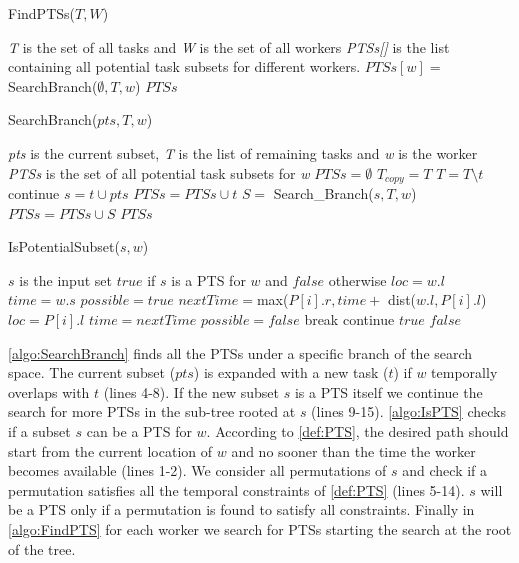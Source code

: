 \begin{algorithm}[h]
\caption{FindPTSs($T, W$)}
\label{algo:FindPTS}
\begin{algorithmic}[1]
\REQUIRE \emph{T} is the set of all tasks and \emph{W} is the set of all workers
\ENSURE \emph{PTSs[]} is the list containing all potential task subsets for different workers.
	\STATE $PTSs[w] = $ SearchBranch($\emptyset, T, w$)
\ENDFOR
\RETURN $PTSs$
\end{algorithmic}
\end{algorithm}

\begin{algorithm}[t]
\caption{SearchBranch($pts, T, w$)}
\label{algo:SearchBranch}
\begin{algorithmic}[1]
\REQUIRE \emph{pts} is the current subset, \emph{T} is the list of remaining tasks and \emph{w} is the worker
\ENSURE \emph{PTSs} is the set of all potential task subsets for \emph{w}
\STATE $PTSs = \emptyset$
\STATE $T_{copy} = T$
	\STATE $T = T \setminus t$
		\STATE continue
	\ENDIF
	\STATE $s = t \cup pts$
		\STATE $PTSs = PTSs \cup t$
			\STATE $S =$ Search\_Branch($s, T, w$)
			\STATE $PTSs = PTSs \cup S$
		\ENDIF
	\ENDIF
\ENDFOR
\RETURN $PTSs$
\end{algorithmic}
\end{algorithm}

\begin{algorithm}[t]
\caption{IsPotentialSubset($s, w$)}
\label{algo:IsPTS}
\begin{algorithmic}[1]
\REQUIRE $s$ is the input set
\ENSURE $true$ if $s$ is a PTS for $w$ and $false$ otherwise
\STATE $loc = w.l$
\STATE $time = w.s$
	\STATE $possible = true$
		\STATE $nextTime = $max($P[i].r, time +$ dist($w.l, P[i].l$)
			\STATE $loc = P[i].l$
			\STATE $time = nextTime$
		\ELSE
			\STATE $possible = false$
			\STATE break
		\ENDIF
	\ENDFOR
		\STATE continue
	\ELSE
		\RETURN $true$
	\ENDIF
\ENDFOR
\RETURN $false$
\end{algorithmic}
\end{algorithm}

\cref{algo:SearchBranch} finds all the PTSs under a specific branch of the search space. The current subset ($pts$) is expanded with a new task ($t$) if $w$ temporally overlaps with $t$ (lines 4-8). If the new subset $s$ is a PTS itself we continue the search for more PTSs in the sub-tree rooted at $s$ (lines  9-15). \cref{algo:IsPTS} checks if a subset $s$ can be a PTS for $w$. According to \cref{def:PTS}, the desired path should start from the current location of $w$ and no sooner than the time the worker becomes available (lines  1-2). We consider all permutations of $s$ and check if a permutation satisfies all the temporal constraints of \cref{def:PTS} (lines 5-14). $s$ will be a PTS only if a permutation is found to satisfy all constraints. Finally in \cref{algo:FindPTS} for each worker we search for PTSs starting the search at the root of the tree.
			
